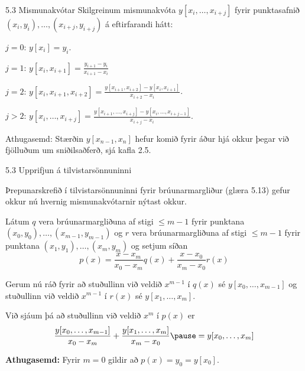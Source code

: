 \begin{frame}{5.3 Mismunakvótar}
 Skilgreinum mismunakvóta $y[x_i,\ldots,x_{i+j}]$ fyrir punktasafnið
 $(x_i,y_i),\ldots,(x_{i+j},y_{i+j})$ á eftirfarandi hátt:

 \pause
 \begin{block}{$j=0$:}
  $y[x_i] = y_i$.
 \end{block}
 \pause
 \begin{block}{$j=1$:}
  $y[x_i,x_{i+1}] = \frac{y_{i+1}-y_i}{x_{i+1}-x_i}$
 \end{block}
 
 \pause
 \begin{block}{$j=2$:}
 $y[x_i,x_{i+1},x_{i+2}] = \frac{y[x_{i+1},x_{i+2}] - y[x_i,x_{i+1}]}{x_{i+2}-x_i}$.
 \end{block}
 
 \pause
 \begin{block}{$j>2$:}
  $y[x_i,\ldots,x_{i+j}] = \frac{y[x_{i+1},\ldots,x_{i+j}] - y[x_i,\ldots,x_{i+j-1}]}{x_{i+j}-x_i}$.
  \end{block}
  \pause

  \begin{block}{Athugasemd:} 
  Stærðin $y[x_{n-1},x_n]$ hefur komið fyrir áður hjá okkur þegar við fjölluðum
  um sniðilsaðferð, sjá kafla 2.5.
\end{block}

\end{frame}


\begin{frame}{5.3 Upprifjun á tilvistarsönnuninni} 

Þrepunarskrefið í tilvistarsönnuninni fyrir brúunarmargliður (glæra 5.13)
gefur okkur nú hvernig mismunakvótarnir nýtast okkur.

\pause
\smallskip
Látum $q$ vera brúunarmargliðuna 
af stigi $\leq m-1$ fyrir punktana $(x_0,y_0), \ldots,
(x_{m-1},y_{m-1})$  og $r$ vera  brúunarmargliðuna af stigi $\leq m-1$
fyrir punktana $(x_1,y_1), \ldots, (x_m,y_m)$ og setjum síðan
\begin{equation*}
  p(x) = \frac{x-x_m}{x_0-x_m}q(x) + \frac{x-x_0}{x_m-x_0}r(x)
\end{equation*}

Gerum nú ráð fyrir að stuðullinn við veldið $x^{m-1}$ í $q(x)$ sé $y[x_0, \ldots, x_{m-1}]$
og stuðullinn við veldið $x^{m-1}$ í $r(x)$ sé $y[x_1, \ldots, x_m]$.

\pause
\smallskip
Við sjáum þá að stuðullinn við veldið
$x^m$ í $p(x)$ er
\begin{equation*}
  \frac{y[x_0, \ldots, x_{m-1}]}{x_0-x_m} + 
  \frac{y[x_1, \ldots, x_m]}{x_m - x_0}
  \pause
  = y[x_0, \ldots, x_m] 
\end{equation*}

\pause
\smallskip
 \textbf{Athugasemd:} Fyrir $m=0$ gildir að $p(x) = y_0 = y[x_0]$.

\end{frame}

